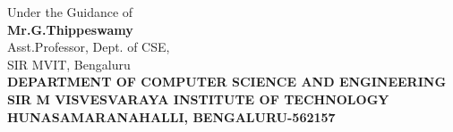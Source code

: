\begin{center}
Under the Guidance of\\
\vspace{5mm}
\textbf{Mr.G.Thippeswamy}\\
\vspace{5mm}
Asst.Professor, Dept. of CSE,\\
\vspace{5mm}
SIR MVIT, Bengaluru\\
\vspace{5mm}
\textbf{DEPARTMENT OF COMPUTER SCIENCE AND ENGINEERING}\\
\vspace{2mm}
\textbf{SIR M VISVESVARAYA INSTITUTE OF TECHNOLOGY}\\
\vspace{2mm}
\textbf{HUNASAMARANAHALLI, BENGALURU-562157} \\

\end{center}
%